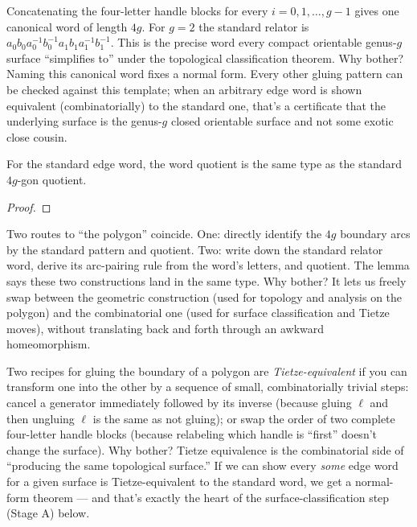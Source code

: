 \begin{layman}
Concatenating the four-letter handle blocks for every
\(i=0,1,\ldots,g-1\) gives one canonical word of length \(4g\). For
\(g=2\) the standard relator is \(a_0 b_0 a_0^{-1} b_0^{-1}
a_1 b_1 a_1^{-1} b_1^{-1}\). This is the precise word every compact
orientable genus-\(g\) surface ``simplifies to'' under the topological
classification theorem. Why bother? Naming this canonical word fixes
a normal form. Every other gluing pattern can be checked against
this template; when an arbitrary edge word is shown equivalent
(combinatorially) to the standard one, that's a certificate that the
underlying surface is the genus-\(g\) closed orientable
surface and not some exotic close cousin.
\end{layman}

\begin{lemma}
\label{lem:polygon4g-eq-standard-word-quotient}
For the standard edge word, the word quotient is the same type as the
standard \(4g\)-gon quotient.
\leanok
\end{lemma}
\begin{proof}\leanok\end{proof}

\begin{layman}
Two routes to ``the polygon'' coincide. One: directly identify the
\(4g\) boundary arcs by the standard pattern and quotient. Two:
write down the standard relator word, derive its arc-pairing rule
from the word's letters, and quotient. The lemma says these two
constructions land in the same type. Why bother? It lets us freely
swap between the geometric construction (used for topology and
analysis on the polygon) and the combinatorial one (used for surface
classification and Tietze moves), without translating back and forth
through an awkward homeomorphism.
\end{layman}



\begin{layman}
Two recipes for gluing the boundary of a polygon are
\emph{Tietze-equivalent} if you can transform one into the other by
a sequence of small, combinatorially trivial steps: cancel a
generator immediately followed by its inverse (because gluing
\(\ell\) and then ungluing \(\ell\) is the same as not gluing); or
swap the order of two complete four-letter handle blocks (because
relabeling which handle is ``first'' doesn't change the surface).
Why bother? Tietze equivalence is the combinatorial side of
``producing the same topological surface.'' If we can show every
\emph{some} edge word for a given surface is Tietze-equivalent to the
standard word, we get a normal-form theorem --- and that's exactly the
heart of the surface-classification step (Stage A) below.
\end{layman}

